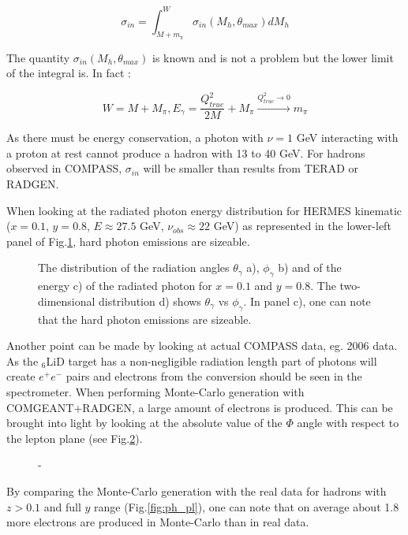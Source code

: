 \begin{equation}
    \sigma_{in} = \int_{M+m_{\pi}}^{W}\sigma_{in}(M_{h},\theta_{max})dM_h
\end{equation}

The quantity $\sigma_{in}(M_{h},\theta_{max})$ is known and is not a problem but the lower limit of the integral is. In fact :

\begin{equation}
    W = M + M_{\pi}, E_{\gamma} = \frac{Q^2_{true}}{2M}+M_{\pi} \xrightarrow{Q^2_{true} \rightarrow 0} m_{\pi}
\end{equation}

As there must be energy conservation, a photon with $\nu = 1$ GeV interacting with a proton at rest cannot produce a hadron with
13 to 40 GeV. For hadrons observed in COMPASS, $\sigma_{in}$ will be smaller than results from TERAD or RADGEN.

When looking at the radiated photon energy distribution for HERMES kinematic ($x=0.1$, $y=0.8$, $E\approx27.5$ GeV, $\nu_{obs}\approx22$ GeV)
as represented in the lower-left panel of Fig.\ref{fig:RAD}, hard photon emissions are sizeable.

\begin{figure}[htb]
\centerline{}
\caption{The distribution of the radiation angles $\theta_{\gamma}$ a), $\phi_{\gamma}$ b) and of the energy c) of the radiated
photon for $x=0.1$ and $y=0.8$. The two-dimensional distribution d) shows $\theta_{\gamma}$ vs $\phi_{\gamma}$. In panel c), one
can note that the hard photon emissions are sizeable.}\label{fig:RAD}
\end{figure}

Another point can be made by looking at actual COMPASS data, eg. 2006 data. As the $_{6}$LiD target has a non-negligible radiation length
part of photons will create $e^+e^-$ pairs and electrons from the conversion should be seen in the spectrometer. When performing Monte-Carlo generation
with COMGEANT+RADGEN, a large amount of electrons is produced. This can be brought into light by looking at the absolute value of the $\Phi$ angle
with respect to the lepton plane (see Fig.\ref{fig:elprod}).

\begin{figure}[htb!]
\centerline{}
\caption{-}\label{fig:elprod}
\end{figure}

By comparing the Monte-Carlo generation with the real data for hadrons with $z>0.1$ and full $y$ range (Fig.\ref{fig:ph_pl}), one can note that on
average about 1.8 more electrons are produced in Monte-Carlo than in real data.

